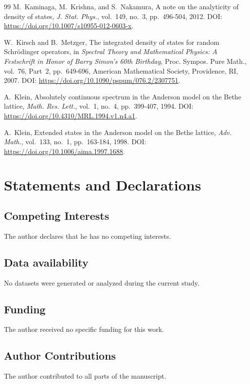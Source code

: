 \documentclass[a4paper,11pt]{article}
\begin{document}
\begin{thebibliography}{99}
M.~Kaminaga, M.~Krishna, and S.~Nakamura,
A note on the analyticity of density of states,
\textit{J. Stat. Phys.},
vol.~149, no.~3, pp.~496-504, 2012.
DOI: \url{https://doi.org/10.1007/s10955-012-0603-x}.

W.~Kirsch and B.~Metzger,
The integrated density of states for random Schr\"odinger operators,
in \textit{Spectral Theory and Mathematical Physics: A Festschrift in Honor of Barry Simon's 60th Birthday},
Proc. Sympos. Pure Math., vol.~76, Part~2, pp.~649-696,
American Mathematical Society, Providence, RI, 2007.
DOI: \url{https://doi.org/10.1090/pspum/076.2/2307751}.

A.~Klein,
Absolutely continuous spectrum in the Anderson model on the Bethe lattice,
\textit{Math. Res. Lett.},
vol.~1, no.~4, pp.~399-407, 1994.
DOI: \url{https://doi.org/10.4310/MRL.1994.v1.n4.a1}.

A.~Klein,
Extended states in the Anderson model on the Bethe lattice,
\textit{Adv. Math.},
vol.~133, no.~1, pp.~163-184, 1998.
DOI: \url{https://doi.org/10.1006/aima.1997.1688}.

\end{thebibliography}

\section*{Statements and Declarations}

\subsection*{Competing Interests}
The author declares that he has no competing interests.

\subsection*{Data availability}
No datasets were generated or analyzed during the current study.

\subsection*{Funding}
The author received no specific funding for this work.

\subsection*{Author Contributions}
The author contributed to all parts of the manuscript.

\end{document}
